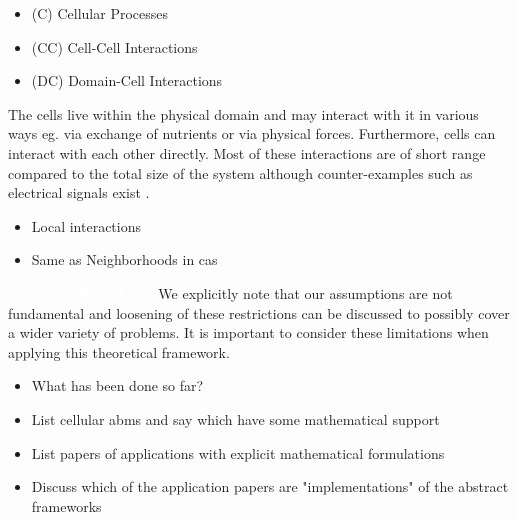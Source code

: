 \documentclass{article}
\newcommand{\todo}[1]{\colorbox{WildStrawberry}{\textcolor{white}{#1}}}
\begin{document}
\begin{itemize}
    \item (C) Cellular Processes
    \item (CC) Cell-Cell Interactions
    \item (DC) Domain-Cell Interactions
\end{itemize}

The cells live within the physical domain and may interact with it in various ways eg. via exchange
of nutrients or via physical forces.
Furthermore, cells can interact with each other directly.
Most of these interactions are of short range compared to the total size of the system although
counter-examples such as electrical signals exist \cite{Ded2021}.

\begin{itemize}
    \item Local interactions
    \item Same as Neighborhoods in \acp{ca}
\end{itemize}

\todo{maybe insert this later?}
We explicitly note that our assumptions are not fundamental and loosening of these restrictions can
be discussed to possibly cover a wider variety of problems.
It is important to consider these limitations when applying this theoretical framework.

\begin{itemize}
    \item What has been done so far?
    \item List cellular \acp{abm} and say which have some mathematical support
    \item List papers of applications with explicit mathematical formulations
    \item Discuss which of the application papers are "implementations" of the abstract frameworks
\end{itemize}
\end{document}
